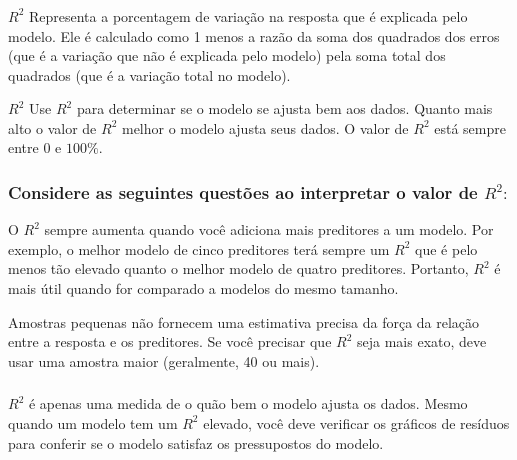 \documentclass[14pt,aspectratio=1610]{beamer}
\begin{document}

 

\begin{frame}{}
\frametitle{ }
\begin{block}{$R^2$}
\justifying
Representa a porcentagem de variação na resposta que é explicada pelo modelo. Ele é calculado como 1 menos a razão da soma dos quadrados dos erros (que é a variação que não é explicada pelo modelo) pela soma total dos quadrados (que é a variação total no modelo). 
\end{block}\pause
\begin{block}{$R^2$}
\justifying
Use $R^{2}$ para determinar se o modelo se ajusta bem aos dados. Quanto mais alto o valor de $R^{2}$ melhor o modelo ajusta seus dados. O valor de $R^{2}$ está sempre entre 0 e $100\%.$
\end{block}
\end{frame}


\begin{frame}{}
\frametitle{Considere as seguintes questões ao interpretar o valor de $R^{2}:$}
\begin{block}{}
\justifying
O $R^{2}$ sempre aumenta quando você adiciona mais preditores a um modelo. Por exemplo, o melhor modelo de cinco preditores terá sempre um $R^{2}$ que é pelo menos tão elevado quanto o melhor modelo de quatro preditores. Portanto, $R^{2}$ é mais útil quando for comparado a modelos do mesmo tamanho. 
\end{block}\pause
\begin{block}{}
\justifying
Amostras pequenas não fornecem uma estimativa precisa da força da relação entre a resposta e os preditores. Se você precisar que $R^{2}$ seja mais exato, deve usar uma amostra maior (geralmente, 40 ou mais). 
\end{block}
\end{frame}

\begin{frame}{}
\frametitle{ }
\begin{block}{}
\justifying
$R^{2}$ é apenas uma medida de o quão bem o modelo ajusta os dados. Mesmo quando um modelo tem um $R^{2}$ elevado, você deve verificar os gráficos de resíduos para conferir se o modelo satisfaz os pressupostos do modelo. 
\end{block}
\end{frame}
\end{document}
